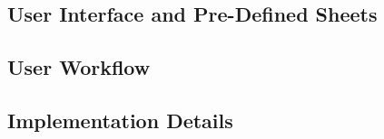 \subsection{User Interface and Pre-Defined Sheets}




\subsection{User Workflow}


\subsection{Implementation Details\label{sec:implementation}}























